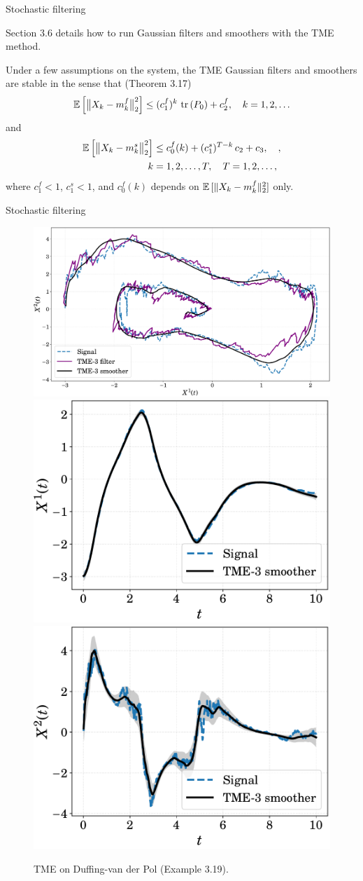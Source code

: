\documentclass[seriffont, cmap=Beijing, 10pt]{zz}
\begin{document}
\begin{frame}{Stochastic filtering}
	\begin{block}{}
		\alert{Section 3.6} details how to run Gaussian filters and smoothers with the TME method.
	\end{block}
	\begin{block}{}
		Under a few assumptions on the system, the TME Gaussian filters and smoothers are \alert{stable} in the sense that (\alert{Theorem 3.17})
		\begin{equation}
			\expecBig{\normbig{X_k - m^f_k}_2^2} \leq (c^f_1)^k \, \trace{P_0} + c^f_2, \quad k=1,2,\ldots
		\end{equation}
		and 
		\begin{equation}
			\begin{split}
				\operatorname{\mathbb{E}} \Big[ \big \lVert X_k - m^s_k \big \rVert_2^2 \Big] &\leq c^f_0(k) + (c^s_1)^{T-k} \, c_2 + c_3, \quad,\\
				k&=1,2,\ldots,T, \quad T=1,2,\ldots,
			\end{split}
		\end{equation}
		where $c^f_1<1$, $c^s_1<1$, and $c^f_0(k)$ depends on $\expec{\norm{X_k - m^f_k}_2^2}$ \alert{only}. 
	\end{block}
\end{frame}

\begin{frame}{Stochastic filtering}
	\begin{figure}
		\centering
		\includegraphics[width=.6\linewidth]{../thesis_latex/figs/tme-duffing-filter-smoother}\\
		\includegraphics[width=.4\linewidth]{../thesis_latex/figs/tme-duffing-smoother-x1}
		\includegraphics[width=.4\linewidth]{../thesis_latex/figs/tme-duffing-smoother-x2}
		\caption{TME on Duffing-van der Pol (\alert{Example 3.19}).}
	\end{figure}
\end{frame}
\end{document}
